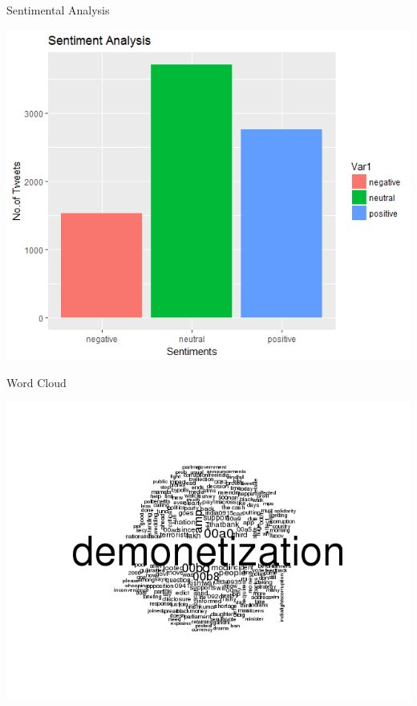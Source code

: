 \documentclass[14pt]{beamer}
\begin{document}
\begin{frame}{Sentimental Analysis}
  \begin{center}
    \includegraphics[scale=0.6]{Tweets-Sentiment.png}
  \end{center}
\end{frame}
\begin{frame}{Word Cloud}
  \begin{center}
\includegraphics[scale=0.7]{wordCloud.png}
  \end{center}
\end{frame}
\end{document}
